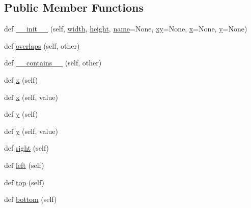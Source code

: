 \subsection*{Public Member Functions}
\begin{DoxyCompactItemize}
\item 
def \hyperlink{classsylva_1_1misc_1_1plot_1_1rectangle_aa01b01f82b1ab5f4e7fb2bba478a13e6}{\+\_\+\+\_\+init\+\_\+\+\_\+} (self, \hyperlink{classsylva_1_1misc_1_1plot_1_1rectangle_ad81773b097d59cb5c67b7e06ab6c022c}{width}, \hyperlink{classsylva_1_1misc_1_1plot_1_1rectangle_aa6bbc8337c03f65fc0097a8013f9c475}{height}, \hyperlink{classsylva_1_1misc_1_1plot_1_1rectangle_aea9a12e78d03675a8af2682b9bbd656b}{name}=None, \hyperlink{classsylva_1_1misc_1_1plot_1_1rectangle_a1bf48f6505e5a549e1056f6a8cb0b454}{xy}=None, \hyperlink{classsylva_1_1misc_1_1plot_1_1rectangle_a935b64e6f087b6ab153df8a45e6dd72d}{x}=None, \hyperlink{classsylva_1_1misc_1_1plot_1_1rectangle_a3067088c7894de27d5a3338077ef027b}{y}=None)
\item 
def \hyperlink{classsylva_1_1misc_1_1plot_1_1rectangle_a95db845fde73592eef007ab940b8b140}{overlaps} (self, other)
\item 
def \hyperlink{classsylva_1_1misc_1_1plot_1_1rectangle_a097b8412cf074afb98f7f88cd0e2f1bc}{\+\_\+\+\_\+contains\+\_\+\+\_\+} (self, other)
\item 
def \hyperlink{classsylva_1_1misc_1_1plot_1_1rectangle_a935b64e6f087b6ab153df8a45e6dd72d}{x} (self)
\item 
def \hyperlink{classsylva_1_1misc_1_1plot_1_1rectangle_a94fe87f391637f1ddf6ab629ffea76a1}{x} (self, value)
\item 
def \hyperlink{classsylva_1_1misc_1_1plot_1_1rectangle_a3067088c7894de27d5a3338077ef027b}{y} (self)
\item 
def \hyperlink{classsylva_1_1misc_1_1plot_1_1rectangle_a99edbd1ca0485e36233c604797adcda8}{y} (self, value)
\item 
def \hyperlink{classsylva_1_1misc_1_1plot_1_1rectangle_a50bdb9a7a95b6e03a66ce8031649ff9f}{right} (self)
\item 
def \hyperlink{classsylva_1_1misc_1_1plot_1_1rectangle_a4080bf5f63cc48132e480b458369af41}{left} (self)
\item 
def \hyperlink{classsylva_1_1misc_1_1plot_1_1rectangle_ac5b4d8952847953f5aa329fb839b63ad}{top} (self)
\item 
def \hyperlink{classsylva_1_1misc_1_1plot_1_1rectangle_a1ad220e20ea15beaeafdd814705d570e}{bottom} (self)
\item 

\end{DoxyCompactItemize}
